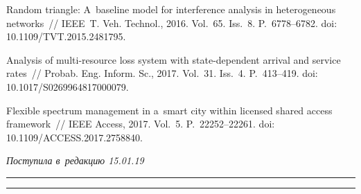 \begin{multicols}{2}
{{\begin{thebibliography}{99}
 Random triangle: 
A~baseline model for interference analysis in heterogeneous networks~// IEEE~T.  
Veh. Technol., 2016. Vol.~65. Iss.~8. P.~6778--6782. doi: 10.1109/TVT.2015.2481795.

 Analysis of multi-resource loss system with state-dependent arrival 
and service rates~// Probab.  Eng. Inform. Sc., 2017. Vol.~31. Iss.~4.  
P.~413--419. doi: 10.1017/S0269964817000079.

 Flexible spectrum management in a~smart city within licensed shared access 
framework~// IEEE Access, 2017. Vol.~5. P.~22252--22261. doi: 
10.1109/ACCESS.2017.2758840.
 \end{thebibliography}

 }
 }

\end{multicols}

\vspace*{-3pt}

\hfill{\small\textit{Поступила в~редакцию 15.01.19}}

\vspace*{12pt}




\hrule

\vspace*{2pt}

\hrule


\def\tit{COMPARATIVE ANALYSIS OF~PERFORMANCE MEASURES FOR~A~WIRELESS 
MACHINE-TO-MACHINE NETWORK MODEL OPERATING WITHIN~TWO RADIO RESOURCE MANAGEMENT POLICIES}


\def\titkol{Comparative analysis of performance measures for a~wireless 
machine-to-machine network model} %

\def\aut{E.\,V.~Markova$^1$, A.\,A.~Golskaia$^1$, I.\,L.~Dzantiev$^1$, 
I.\,A.~Gudkova$^{1,2}$, and~S.\,Ya.~Shorgin$^{1,2}$}

\def\autkol{E.\,V.~Markova, A.\,A.~Golskaia, I.\,L.~Dzantiev, et al.} 

